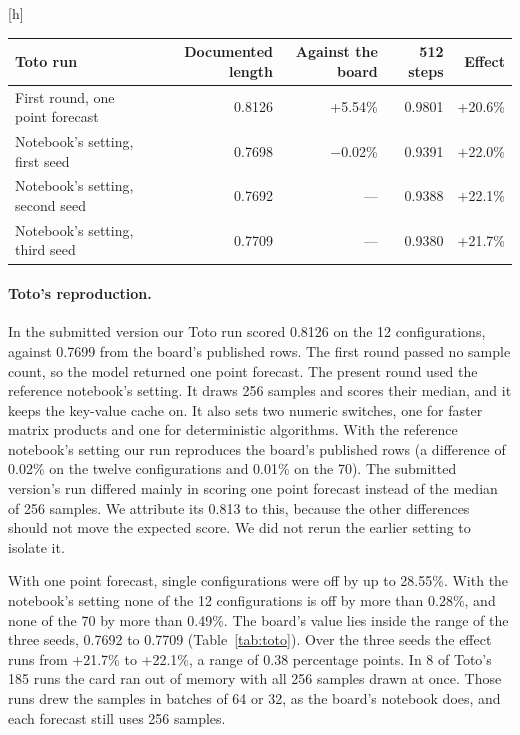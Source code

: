 \documentclass{article}
\makeatletter
\renewenvironment{table}
  {\setlength{\abovecaptionskip}{6\p@}%
   \setlength{\belowcaptionskip}{\z@}%
   \@float{table}}
  {\end@float}
\makeatother
\begin{document}
\begin{table}[h]
\centering
\small
\begin{tabular}{@{}lrrrr@{}}
\toprule
\textbf{Toto run} & \textbf{Documented length} & \textbf{Against the board} & \textbf{512 steps} & \textbf{Effect} \\
\midrule
First round, one point forecast & 0.8126 & +5.54\% & 0.9801 & +20.6\% \\
Notebook's setting, first seed & 0.7698 & $-$0.02\% & 0.9391 & +22.0\% \\
Notebook's setting, second seed & 0.7692 & --- & 0.9388 & +22.1\% \\
Notebook's setting, third seed & 0.7709 & --- & 0.9380 & +21.7\% \\
\bottomrule
\end{tabular}
\caption{Toto on the first round's 12 configurations, as the geometric mean of scaled MASE.
The board's published rows give 0.7699. The reference notebook's setting draws 256 samples and
scores their median. The first seed is the value of record.}
\label{tab:toto}
\end{table}

\paragraph{Toto's reproduction.} In the submitted version our Toto run scored 0.8126 on the 12
configurations, against 0.7699 from the board's published rows. The first round passed no
sample count, so the model returned one point forecast. The present round used the reference
notebook's setting. It draws 256 samples and scores their median, and it keeps the key-value
cache on. It also sets two numeric switches, one for faster matrix products and one for
deterministic algorithms. With the reference notebook's setting our run reproduces the board's published rows
(a difference of 0.02\% on the twelve configurations and 0.01\% on the 70). The submitted
version's run differed mainly in scoring one point forecast instead of the median of 256
samples. We attribute its 0.813 to this, because the other differences should not move the
expected score. We did not rerun the earlier setting to isolate it.

With one point forecast, single configurations were off by up to 28.55\%. With the notebook's
setting none of the 12 configurations is off by more than 0.28\%, and none of the 70 by more
than 0.49\%. The board's value lies inside the range of the three seeds, 0.7692 to 0.7709
(Table~\ref{tab:toto}). Over the three seeds the effect runs from +21.7\% to +22.1\%, a range of
0.38 percentage points. In 8 of Toto's 185 runs the card ran out of memory with all 256
samples drawn at once. Those runs drew the samples in batches of 64 or 32, as the board's
notebook does, and each forecast still uses 256 samples.
\end{document}
